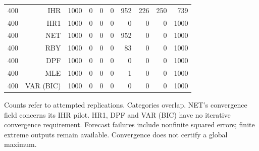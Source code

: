 \begin{table}[p]
\begin{tabular}{rrrrrrrrrr}
400 & IHR & 1000 & 0 & 0 & 0 & 952 & 226 & 250 &  739 \\
400 & HR1 & 1000 & 0 & 0 & 0 &   0 &   0 &   0 & 1000 \\
400 & NET & 1000 & 0 & 0 & 0 & 952 &   0 &   0 & 1000 \\
400 & RBY & 1000 & 0 & 0 & 0 &  83 &   0 &   0 & 1000 \\
400 & DPF & 1000 & 0 & 0 & 0 &   0 &   0 &   0 & 1000 \\
400 & MLE & 1000 & 0 & 0 & 0 &   1 &   0 &   0 & 1000 \\
400 & VAR (BIC) & 1000 & 0 & 0 & 0 &   0 &   0 &   0 & 1000 \\
\bottomrule\end{tabular}
\par\medskip
\begin{minipage}{0.98\linewidth}\footnotesize Counts refer to attempted replications. Categories overlap. NET's convergence field concerns its IHR pilot. HR1, DPF and VAR (BIC) have no iterative convergence requirement. Forecast failures include nonfinite squared errors; finite extreme outputs remain available. Convergence does not certify a global maximum.\end{minipage}
\end{table}

